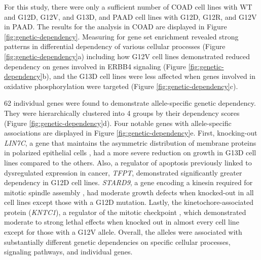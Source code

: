 For this study, there were only a sufficient number of COAD cell lines with WT \KRAS{} and \KRAS{} G12D, G12V, and G13D, and PAAD cell lines with G12D, G12R, and G12V in PAAD.
The results for the analysis in COAD are displayed in Figure \ref{fig:genetic-dependency}.
Measuring for gene set enrichment revealed strong patterns in differential dependency of various cellular processes (Figure \ref{fig:genetic-dependency}a) including how \KRAS{} G12V cell lines demonstrated reduced dependency on genes involved in ERBB4 signaling (Figure \ref{fig:genetic-dependency}b), and the \KRAS{} G13D cell lines were less affected when genes involved in oxidative phosphorylation were targeted (Figure \ref{fig:genetic-dependency}c).

62 individual genes were found to demonstrate \KRAS{} allele-specific genetic dependency.
They were hierarchically clustered into 4 groups by their dependency scores (Figure \ref{fig:genetic-dependency}d).
Four notable genes with allele-specific associations are displayed in Figure \ref{fig:genetic-dependency}e.
First, knocking-out \emph{LIN7C}, a gene that maintains the asymmetric distribution of membrane proteins in polarized epithelial cells \cite{Monastyrskaya2013MiR-199a-5pSyndrome}, had a more severe reduction on growth in \KRAS{} G13D cell lines compared to the others.
Also, a regulator of apoptosis previously linked to dysregulated expression in cancer, \emph{TFPT}, demonstrated significantly greater dependency in G12D cell lines.
\emph{STARD9}, a gene encoding a kinesin required for mitotic spindle assembly \cite{Torres2011TheAssembly}, had moderate growth defects when knocked-out in all cell lines except those with a \KRAS{} G12D mutation.
Lastly, the kinetochore-associated protein (\emph{KNTC1}), a regulator of the mitotic checkpoint \cite{Chan2000HumanKinetochores., Scaerou2001TheKinetochore., Kops2005ZW10Kinetochore.}, which demonstrated moderate to strong lethal effects when knocked out in almost every cell line except for those with a \KRAS{} G12V allele.
Overall, the \KRAS{} alleles were associated with substantially different genetic dependencies on specific cellular processes, signaling pathways, and individual genes.


